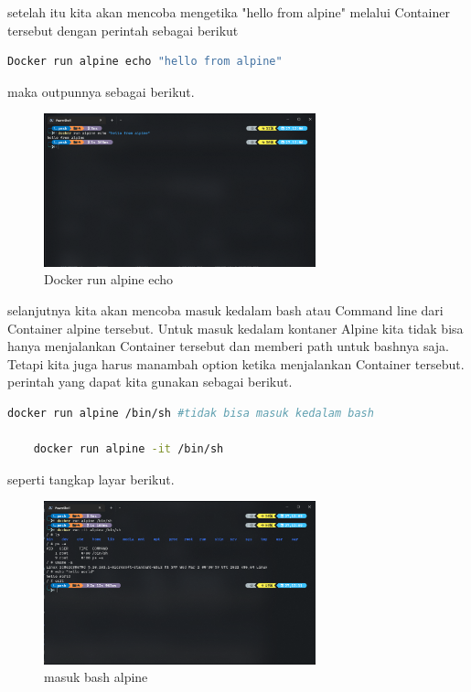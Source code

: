 \documentclass[11pt,a4paper]{article}
\begin{document}
setelah itu kita akan mencoba mengetika "hello from alpine" melalui Container tersebut dengan perintah sebagai berikut
\begin{lstlisting}[language = bash]
	Docker run alpine echo "hello from alpine"
\end{lstlisting} 
maka outpunnya sebagai berikut.
\begin{figure}[h]
	\centering
	\includegraphics[width = 0.7\textwidth]{Figure/asset/run apline echo.png}
	\caption{Docker run alpine echo}
\end{figure}

\newpage
selanjutnya kita akan mencoba masuk kedalam bash atau Command line dari Container alpine tersebut.
Untuk masuk kedalam kontaner Alpine kita tidak bisa hanya menjalankan Container tersebut dan memberi path untuk bashnya saja.
Tetapi kita juga harus manambah option ketika menjalankan Container tersebut. perintah yang dapat kita gunakan sebagai berikut.
\begin{lstlisting}[language = bash]
	docker run alpine /bin/sh #tidak bisa masuk kedalam bash

	docker run alpine -it /bin/sh 
\end{lstlisting}
seperti tangkap layar berikut.
\begin{figure}[h]
	\centering
	\includegraphics[width = 0.7\textwidth]{Figure/asset/docker_bin_sh.png}
	\caption{masuk bash alpine}
\end{figure}
\end{document}
